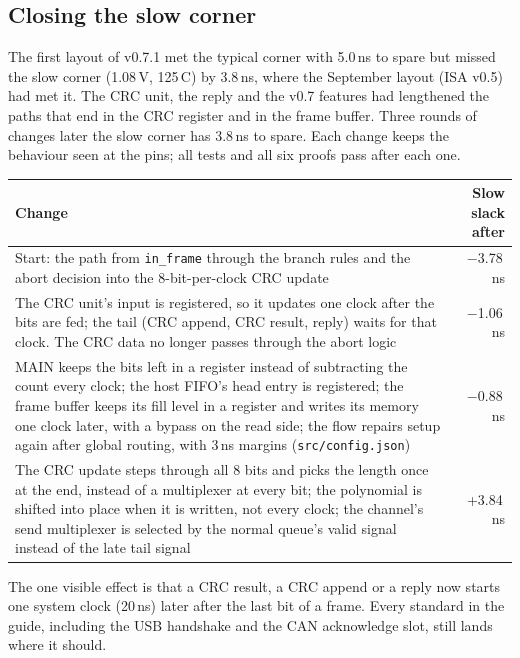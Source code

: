 \documentclass[11pt,a4paper]{article}
\newcommand{\sig}[1]{\texttt{#1}}
\begin{document}
\subsection{Closing the slow corner}

The first layout of v0.7.1 met the typical corner with 5.0\,ns to spare but missed the slow corner (1.08\,V, 125\,\textdegree C) by 3.8\,ns, where the September layout (ISA v0.5) had met it. The CRC unit, the reply and the v0.7 features had lengthened the paths that end in the CRC register and in the frame buffer. Three rounds of changes later the slow corner has 3.8\,ns to spare. Each change keeps the behaviour seen at the pins; all tests and all six proofs pass after each one.

\begin{center}
\begin{tabularx}{\linewidth}{@{}L r@{}}
\toprule
Change & Slow slack after \\
\midrule
Start: the path from \sig{in\_frame} through the branch rules and the abort decision into the 8-bit-per-clock CRC update & $-$3.78\,ns \\
The CRC unit's input is registered, so it updates one clock after the bits are fed; the tail (CRC append, CRC result, reply) waits for that clock. The CRC data no longer passes through the abort logic & $-$1.06\,ns \\
MAIN keeps the bits left in a register instead of subtracting the count every clock; the host FIFO's head entry is registered; the frame buffer keeps its fill level in a register and writes its memory one clock later, with a bypass on the read side; the flow repairs setup again after global routing, with 3\,ns margins (\sig{src/config.json}) & $-$0.88\,ns \\
The CRC update steps through all 8 bits and picks the length once at the end, instead of a multiplexer at every bit; the polynomial is shifted into place when it is written, not every clock; the channel's send multiplexer is selected by the normal queue's valid signal instead of the late tail signal & +3.84\,ns \\
\bottomrule
\end{tabularx}
\end{center}

The one visible effect is that a CRC result, a CRC append or a reply now starts one system clock (20\,ns) later after the last bit of a frame. Every standard in the guide, including the USB handshake and the CAN acknowledge slot, still lands where it should.
\end{document}
